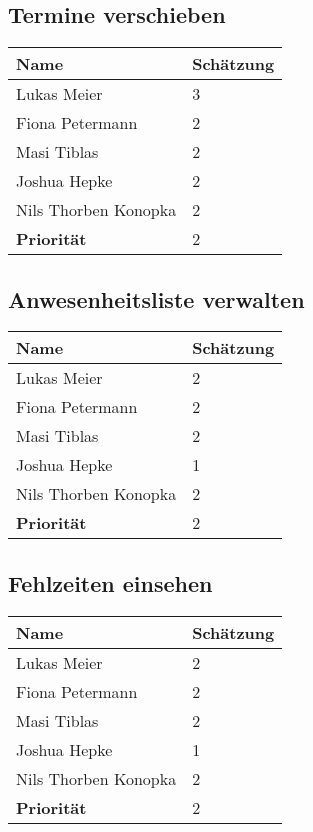 \newpage

\subsection{Termine verschieben}
\begin{tabular} {|p{5cm}|p{}|}
	\hline
	Name & Schätzung \\
	\hline
	Lukas Meier 
	& 3 \\
	\hline
	Fiona Petermann 
	& 2 \\
	\hline
	Masi Tiblas 
	& 2 \\
	\hline
	Joshua Hepke
	& 2 \\
	\hline
	Nils Thorben Konopka
	& 2 \\
	\hline \hline
	\textbf{Priorität}
	& 2 \\
	\hline
\end{tabular}

\newpage

\subsection{Anwesenheitsliste verwalten}
\begin{tabular} {|p{5cm}|p{}|}
	\hline
	Name & Schätzung \\
	\hline
	Lukas Meier 
	& 2 \\
	\hline
	Fiona Petermann 
	& 2 \\
	\hline
	Masi Tiblas 
	& 2 \\
	\hline
	Joshua Hepke
	& 1 \\
	\hline
	Nils Thorben Konopka
	& 2 \\
	\hline \hline
	\textbf{Priorität}
	& 2 \\
	\hline
\end{tabular}

\newpage

\subsection{Fehlzeiten einsehen}
\begin{tabular} {|p{5cm}|p{}|}
	\hline
	Name & Schätzung \\
	\hline
	Lukas Meier 
	& 2 \\
	\hline
	Fiona Petermann 
	& 2 \\
	\hline
	Masi Tiblas 
	& 2 \\
	\hline
	Joshua Hepke
	& 1 \\
	\hline
	Nils Thorben Konopka
	& 2 \\
	\hline \hline
	\textbf{Priorität}
	& 2 \\
	\hline
\end{tabular}

